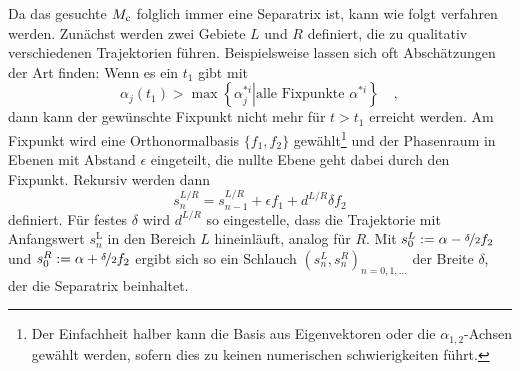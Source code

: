     Da das gesuchte $M_\text{c}$ folglich immer eine Separatrix ist, kann wie folgt verfahren werden. 
    Zunächst werden zwei Gebiete $L$ und $R$ definiert, die zu qualitativ verschiedenen 
    Trajektorien führen. Beispielsweise lassen sich oft Abschätzungen der Art finden: Wenn es 
    ein $t_1$ gibt mit
    \begin{equation}
     \alpha_j(t_1) > \max \left\{ \left. \alpha^{*i}_j \right|\text{alle Fixpunkte } 
     \alpha^{*i}\right\} \quad ,
    \end{equation}
    dann kann der gewünschte Fixpunkt nicht mehr für $t>t_1$ erreicht werden.
    Am Fixpunkt wird eine Orthonormalbasis $\{f_1,f_2\}$ gewählt\footnote{Der Einfachheit halber 
    kann die Basis aus Eigenvektoren oder die $\alpha_{1,2}$-Achsen gewählt werden, sofern dies 
    zu keinen numerischen schwierigkeiten führt.}
    und der Phasenraum in Ebenen mit Abstand $\epsilon$ 
    eingeteilt, die nullte Ebene geht dabei durch den Fixpunkt. Rekursiv werden dann
    \begin{equation}
     s^{L/R}_n = s^{L/R}_{n-1} + \epsilon f_1 + d^{L/R} \delta f_2 
    \end{equation}
    definiert. Für festes $\delta$ wird $d^{L/R}$ so eingestelle, dass die Trajektorie 
    mit Anfangswert $s^\text{L}_n$ in den Bereich $L$ hineinläuft, analog für $R$. 
    Mit $s^L_0:=\alpha-\nicefrac{\delta}{2}  f_2$ und $s^R_0:=\alpha+\nicefrac{\delta}{2} f_2$ 
    ergibt sich so ein Schlauch $\left(s^{L}_n,s^R_n \right)_{n=0,1,\ldots}$ der Breite 
    $\delta$, der die Separatrix beinhaltet.

    